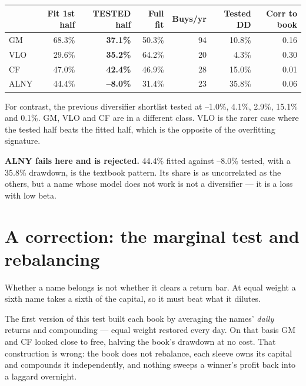 \documentclass[11pt]{article}
\begin{document}
\begin{center}
\footnotesize
\begin{tabular}{@{}l r r r r r r@{}}
\toprule
& \textbf{Fit 1st half} & \textbf{TESTED half} & \textbf{Full fit} & \textbf{Buys/yr}
& \textbf{Tested DD} & \textbf{Corr to book} \\
\midrule
GM   & 68.3\% & \textbf{37.1\%} & 50.3\% & 94 & 10.8\% & 0.16 \\
VLO  & 29.6\% & \textbf{35.2\%} & 64.2\% & 20 &  4.3\% & 0.30 \\
CF   & 47.0\% & \textbf{42.4\%} & 46.9\% & 28 & 15.0\% & 0.01 \\
\rowcolor{bcwarn}
ALNY & 44.4\% & \textbf{--8.0\%} & 31.4\% & 23 & 35.8\% & 0.06 \\
\bottomrule
\end{tabular}
\end{center}

For contrast, the previous diversifier shortlist tested at --1.0\%, 4.1\%, 2.9\%, 15.1\% and
0.1\%. GM, VLO and CF are in a different class. VLO is the rarer case where the tested half beats
the fitted half, which is the opposite of the overfitting signature.

\textbf{ALNY fails here and is rejected.} 44.4\% fitted against --8.0\% tested, with a 35.8\%
drawdown, is the textbook pattern. Its share is as uncorrelated as the others, but a name whose
model does not work is not a diversifier --- it is a loss with low beta.

\section{A correction: the marginal test and rebalancing}

Whether a name belongs is not whether it clears a return bar. At equal weight a sixth name takes a
sixth of the capital, so it must beat what it dilutes.

The first version of this test built each book by averaging the names' \emph{daily} returns and
compounding --- equal weight restored every day. On that basis GM and CF looked close to free,
halving the book's drawdown at no cost. That construction is wrong: the book does not rebalance,
each sleeve owns its capital and compounds it independently, and nothing sweeps a winner's profit
back into a laggard overnight.
\end{document}
